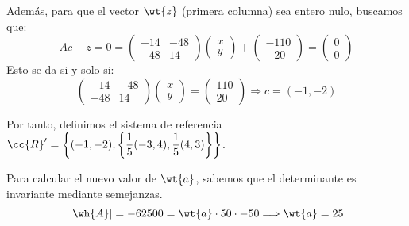 \begin{ejercicio}
\begin{enumerate}
        Además, para que el vector $\wt{z}$ (primera columna) sea entero nulo, buscamos que:
        \begin{equation*}
            Ac + z = 0
            =  \left(\begin{array}{cc}
                -14 & -48 \\
                -48 & 14
            \end{array}\right)\left(\begin{array}{c}
                x\\y
            \end{array}\right) + \left(\begin{array}{c}
                -110 \\ -20
            \end{array}\right) = \left(\begin{array}{c}
                0\\0
            \end{array}\right)
        \end{equation*}
        Esto se da si y solo si:
        \begin{equation*}
            \left(\begin{array}{cc}
                -14 & -48 \\
                -48 & 14
            \end{array}\right)\left(\begin{array}{c}
                x\\y
            \end{array}\right) = \left(\begin{array}{c}
                110 \\ 20
            \end{array}\right) \Longrightarrow c=(-1,-2)
        \end{equation*}

        Por tanto, definimos el sistema de referencia $\cc{R}'=\left\{(-1, -2), \left\{\dfrac{1}{5}(-3,4), \dfrac{1}{5}(4,3)\right\}\right\}$.

        Para calcular el nuevo valor de $\wt{a}$, sabemos que el determinante es invariante mediante semejanzas.
        \begin{equation*}
            |\wh{A}|=-62500= \wt{a}\cdot 50\cdot -50\Longrightarrow \wt{a}=25
        \end{equation*}
        

\end{enumerate}
\end{ejercicio}
